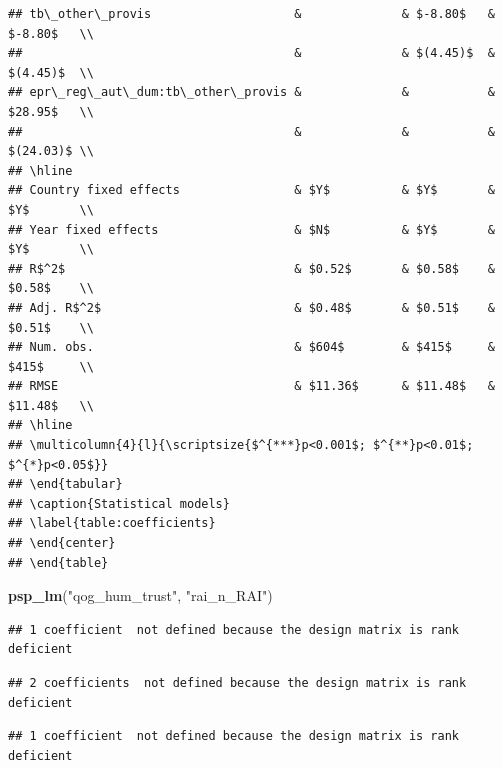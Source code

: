 \documentclass[
]{article}
\newenvironment{Shaded}{\begin{snugshade}}{\end{snugshade}}
\newcommand{\KeywordTok}[1]{\textcolor[rgb]{0.13,0.29,0.53}{\textbf{#1}}}
\newcommand{\NormalTok}[1]{#1}
\newcommand{\StringTok}[1]{\textcolor[rgb]{0.31,0.60,0.02}{#1}}
\begin{document}
\begin{verbatim}
## tb\_other\_provis                    &              & $-8.80$   & $-8.80$   \\
##                                      &              & $(4.45)$  & $(4.45)$  \\
## epr\_reg\_aut\_dum:tb\_other\_provis &              &           & $28.95$   \\
##                                      &              &           & $(24.03)$ \\
## \hline
## Country fixed effects                & $Y$          & $Y$       & $Y$       \\
## Year fixed effects                   & $N$          & $Y$       & $Y$       \\
## R$^2$                                & $0.52$       & $0.58$    & $0.58$    \\
## Adj. R$^2$                           & $0.48$       & $0.51$    & $0.51$    \\
## Num. obs.                            & $604$        & $415$     & $415$     \\
## RMSE                                 & $11.36$      & $11.48$   & $11.48$   \\
## \hline
## \multicolumn{4}{l}{\scriptsize{$^{***}p<0.001$; $^{**}p<0.01$; $^{*}p<0.05$}}
## \end{tabular}
## \caption{Statistical models}
## \label{table:coefficients}
## \end{center}
## \end{table}
\end{verbatim}

\begin{Shaded}
\begin{Highlighting}[]
\KeywordTok{psp_lm}\NormalTok{(}\StringTok{"qog_hum_trust"}\NormalTok{, }\StringTok{"rai_n_RAI"}\NormalTok{)}
\end{Highlighting}
\end{Shaded}

\begin{verbatim}
## 1 coefficient  not defined because the design matrix is rank deficient
\end{verbatim}

\begin{verbatim}
## 2 coefficients  not defined because the design matrix is rank deficient
\end{verbatim}

\begin{verbatim}
## 1 coefficient  not defined because the design matrix is rank deficient
\end{verbatim}
\end{document}
